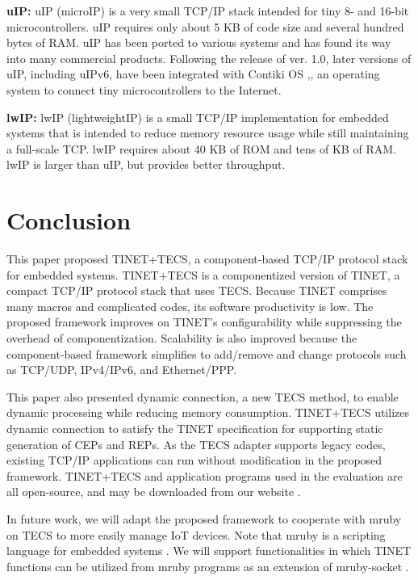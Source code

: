 \documentclass[conference]{IEEEtran/IEEEtran}
\begin{document}
{\bf uIP:}
uIP (microIP) is a very small TCP/IP stack intended for tiny 8- and 16-bit microcontrollers.
uIP requires only about 5 KB of code size and several hundred bytes of RAM.
uIP has been ported to various systems and has found its way into many commercial products.
Following the release of ver. 1.0, later versions of uIP, including uIPv6, have been integrated with Contiki OS \cite{par:Contiki},\cite{url:Contiki}, an operating system to connect tiny microcontrollers to the Internet.

{\bf lwIP:}
lwIP (lightweightIP) is a small TCP/IP implementation for embedded systems that is intended to reduce memory resource usage while still maintaining a full-scale TCP.
lwIP requires about 40 KB of ROM and tens of KB of RAM.
lwIP is larger than uIP, but provides better throughput.


\section{Conclusion}
\label{sec:Conclusion}

This paper proposed TINET+TECS, a component-based TCP/IP protocol stack for embedded systems.
TINET+TECS is a componentized version of TINET, a compact TCP/IP protocol stack that uses TECS.
Because TINET comprises many macros and complicated codes, its software productivity is low.
The proposed framework improves on TINET's configurability while suppressing the overhead of componentization.
Scalability is also improved because the component-based framework simplifies to add/remove and change protocols such as TCP/UDP, IPv4/IPv6, and Ethernet/PPP.

This paper also presented dynamic connection, a new TECS method, to enable dynamic processing while reducing memory consumption.
TINET+TECS utilizes dynamic connection to satisfy the TINET specification for supporting static generation of CEPs and REPs.
As the TECS adapter supports legacy codes, existing TCP/IP applications can run without modification in the proposed framework.
TINET+TECS and application programs used in the evaluation are all open-source, and may be downloaded from our website \cite{url:TINET+TECS}.

In future work, we will adapt the proposed framework to cooperate with mruby on TECS \cite{par:mrubyonTECS} to more easily manage IoT devices.
Note that mruby is a scripting language for embedded systems \cite{par:mruby}.
We will support functionalities in which TINET functions can be utilized from mruby programs as an extension of mruby-socket \cite{url:mruby-library}.
    
\end{document}
